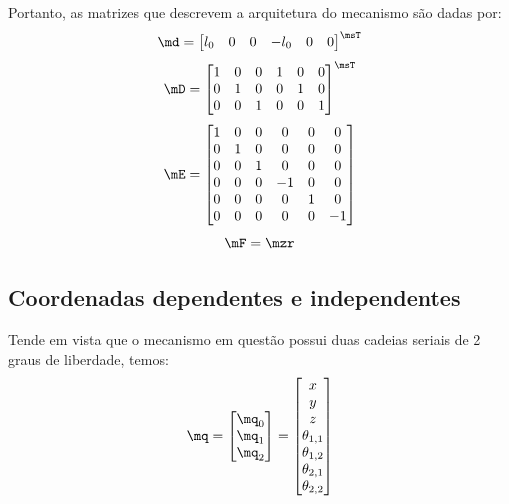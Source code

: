\documentclass[]{politex}
\begin{document}
Portanto, as matrizes que descrevem a arquitetura do mecanismo são dadas por:
\begin{equation}
\md = \begin{bmatrix}
l_0 &
0 &
0 &
-l_0 &
0 &
0 
\end{bmatrix}^\msT
\end{equation}
\begin{equation}
\mD = \begin{bmatrix}
1 & 0 & 0 & 1 & 0 & 0 \\
0 & 1 & 0 & 0 & 1 & 0 \\
0 & 0 & 1 & 0 & 0 & 1 \\
\end{bmatrix}^\msT
\end{equation}
\begin{equation}
\mE = \begin{bmatrix}
1 & 0 & 0 & 0 & 0 & 0 \\
0 & 1 & 0 & 0 & 0 & 0 \\
0 & 0 & 1 & 0 & 0 & 0 \\
0 & 0 & 0 & -1 & 0 & 0 \\
0 & 0 & 0 & 0 & 1 & 0 \\
0 & 0 & 0 & 0 & 0 & -1 \\
\end{bmatrix}
\end{equation}
\begin{equation}
\mF = \mzr
\end{equation}

\subsection{Coordenadas dependentes e independentes}

Tende em vista que o mecanismo em questão possui duas cadeias seriais de 2 graus de liberdade, temos:
\begin{equation}
\mq = \begin{bmatrix}
\mq_0 \\
\mq_1 \\
\mq_2
\end{bmatrix} =
\begin{bmatrix}
x \\
y \\
z \\
\theta_{1,1} \\
\theta_{1,2} \\
\theta_{2,1} \\
\theta_{2,2} \\
\end{bmatrix}
\end{equation}
\end{document}
